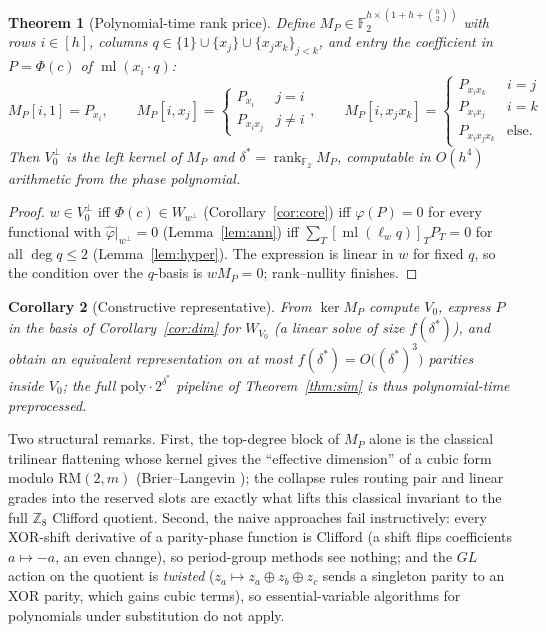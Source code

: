 \documentclass[11pt]{article}
\newtheorem{theorem}{Theorem}
\newtheorem{corollary}[theorem]{Corollary}
\theoremstyle{definition}
\theoremstyle{remark}
\newcommand{\F}{\mathbb{F}_2}
\newcommand{\Z}{\mathbb{Z}}
\newcommand{\RM}{\mathrm{RM}}
\newcommand{\rank}{\operatorname{rank}}
\newcommand{\ml}{\operatorname{ml}}
\newcommand{\ds}{\delta^{*}}
\begin{document}
\begin{theorem}[Polynomial-time rank price]\label{thm:poly}
Define $M_P\in\F^{h\times(1+h+\binom h2)}$ with rows $i\in[h]$,
columns $q\in\{1\}\cup\{x_j\}\cup\{x_jx_k\}_{j<k}$, and entry the coefficient in $P=\Phi(c)$ of $\ml(x_i\cdot q)$:
\[
  M_P[i,1]=P_{x_i},\qquad
  M_P[i,x_j]=\begin{cases}P_{x_i}&j=i\\P_{x_ix_j}&j\ne i\end{cases},\qquad
  M_P[i,x_jx_k]=\begin{cases}P_{x_ix_k}&i=j\\P_{x_ix_j}&i=k\\P_{x_ix_jx_k}&\text{else.}\end{cases}
\]
Then $V_0^{\perp}$ is the left kernel of $M_P$ and $\ds=\rank_{\F}M_P$, computable in $O(h^4)$ arithmetic from
the phase polynomial.
\end{theorem}
\begin{proof}
$w\in V_0^{\perp}$ iff $\Phi(c)\in W_{w^{\perp}}$ (Corollary~\ref{cor:core}) iff $\varphi(P)=0$ for every functional with $\hat\varphi|_{w^{\perp}}=0$
(Lemma~\ref{lem:ann}) iff $\sum_T[\ml(\ell_wq)]_TP_T=0$ for all $\deg q\le2$ (Lemma~\ref{lem:hyper}). The expression is linear in
$w$ for fixed $q$, so the condition over the $q$-basis is $wM_P=0$; rank--nullity finishes.
\end{proof}

\begin{corollary}[Constructive representative]\label{cor:rep}
From $\ker M_P$ compute $V_0$, express $P$ in the basis
of Corollary~\ref{cor:dim} for $W_{V_0}$ (a linear solve of size $f(\ds)$), and obtain an equivalent representation
on at most $f(\ds)=O\bigl((\ds)^3\bigr)$ parities inside $V_0$; the full $\mathrm{poly}\cdot2^{\ds}$ pipeline of Theorem~\ref{thm:sim} is thus
polynomial-time preprocessed.
\end{corollary}

Two structural remarks. First, the top-degree block of $M_P$ alone is the classical trilinear
flattening whose kernel gives the ``effective dimension'' of a cubic form modulo $\RM(2,m)$ (Brier--Langevin
\cite{BL03,KGP26a}); the collapse rules routing pair and linear grades into the reserved
slots are exactly what lifts this classical invariant to the full $\Z_8$ Clifford quotient. Second,
the naive approaches fail instructively: every XOR-shift derivative of a parity-phase function
is Clifford (a shift flips coefficients $a\mapsto-a$, an even change), so period-group methods see
nothing; and the $GL$ action on the quotient is \emph{twisted} ($z_a\mapsto z_a\oplus z_b\oplus z_c$ sends a singleton parity
to an XOR parity, which gains cubic terms), so essential-variable algorithms for polynomials
under substitution \cite{Car06,Kay11,Mon17} do not apply.
\end{document}
